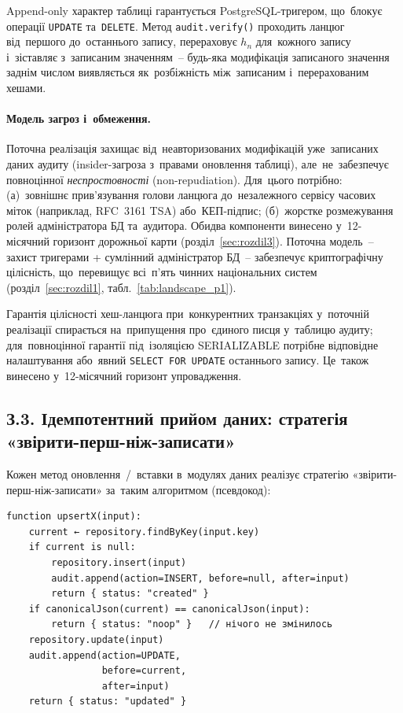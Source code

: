 Append-only характер таблиці гарантується PostgreSQL-тригером, що~блокує операції \texttt{UPDATE} та~\texttt{DELETE}. Метод \texttt{audit.verify()} проходить ланцюг від~першого до~останнього запису, перераховує $h_n$ для~кожного запису і~зіставляє з~записаним значенням~-- будь-яка модифікація записаного значення заднім числом виявляється як~розбіжність між~записаним і~перерахованим хешами.

\paragraph{Модель загроз і~обмеження.} Поточна реалізація захищає від~неавторизованих модифікацій уже~записаних даних аудиту (insider-загроза з~правами оновлення таблиці), але~не~забезпечує повноцінної \emph{неспростовності} (non-repudiation). Для~цього потрібно: (а)~зовнішнє прив'язування голови ланцюга до~незалежного сервісу часових міток (наприклад, RFC~3161 TSA) або~КЕП-підпис; (б)~жорстке розмежування ролей адміністратора БД та~аудитора. Обидва компоненти винесено у~12-місячний горизонт дорожньої карти (розділ~\ref{sec:rozdil3}). Поточна модель~-- захист тригерами + сумлінний адміністратор БД~-- забезпечує криптографічну цілісність, що~перевищує всі~п'ять чинних національних систем (розділ~\ref{sec:rozdil1}, табл.~\ref{tab:landscape_p1}).

Гарантія цілісності хеш-ланцюга при~конкурентних транзакціях у~поточній реалізації спирається на~припущення про~єдиного писця у~таблицю аудиту; для~повноцінної гарантії під~ізоляцією SERIALIZABLE потрібне відповідне налаштування або~явний \texttt{SELECT~FOR~UPDATE} останнього запису. Це~також винесено у~12-місячний горизонт упровадження.

\subsection*{З.3. Ідемпотентний прийом даних: стратегія «звірити-перш-ніж-записати»}
\label{app:idempotent-strategy}

Кожен метод оновлення~/~вставки в~модулях даних реалізує стратегію «звірити-перш-ніж-записати» за~таким алгоритмом (псевдокод):

\begin{verbatim}
function upsertX(input):
    current ← repository.findByKey(input.key)
    if current is null:
        repository.insert(input)
        audit.append(action=INSERT, before=null, after=input)
        return { status: "created" }
    if canonicalJson(current) == canonicalJson(input):
        return { status: "noop" }   // нічого не змінилось
    repository.update(input)
    audit.append(action=UPDATE,
                 before=current,
                 after=input)
    return { status: "updated" }
\end{verbatim}

